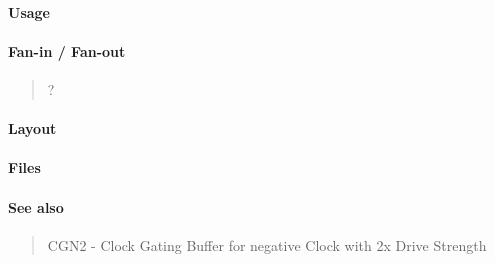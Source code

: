 \paragraph{Usage}

\paragraph{Fan-in / Fan-out}
\begin{quote}
    ?
\end{quote}

\paragraph{Layout}

\paragraph{Files}
%

\paragraph{See also}
\begin{quote}
    CGN2 - Clock Gating Buffer for negative Clock with 2x Drive Strength
\end{quote}
